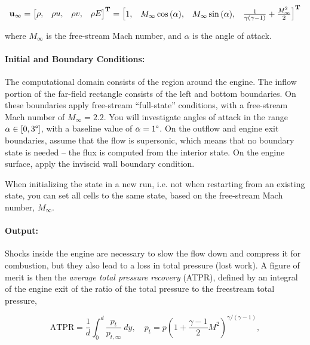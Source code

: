 \begin{equation}\label{eqn:flow}
    \bf{u}_{\infty} = \begin{bmatrix} \rho, & \rho u, & \rho v, & \rho E \end{bmatrix}^{T} = \begin{bmatrix}
        1, & M_\infty\cos{(\alpha)}, & M_\infty\sin{(\alpha)}, & \frac{1}{\gamma(\gamma-1)} + \frac{M_\infty^2}{2}
    \end{bmatrix}^T
\end{equation}

where $M_\infty$ is the free-stream Mach number, and $\alpha$ is the angle of attack.

\paragraph{Initial and Boundary Conditions:} The computational domain consists of the region around the engine. The inflow portion of the far-field rectangle consists of the left and bottom boundaries. On these boundaries apply free-stream ``full-state'' conditions, with a free-stream Mach number of $M_\infty = 2.2$. You will investigate angles of attack in the range $\alpha \in [0, 3\degree]$, with a baseline value of $\alpha = 1\degree$. On the outflow and engine exit boundaries, assume that the flow is supersonic, which means that no boundary state is needed -- the flux is computed from the interior state. On the engine surface, apply the inviscid wall boundary condition.

When initializing the state in a new run, i.e. not when restarting from an existing state, you can set all cells to the same state, based on the free-stream Mach number, $M_\infty$.


\paragraph{Output:} Shocks inside the engine are necessary to slow the flow down and compress it for combustion, but they also lead to a loss in total pressure (lost work). A figure of merit is then the
\textit{average total pressure recovery} (ATPR), defined by an integral of the engine exit of the ratio of the
total pressure to the freestream total pressure,

\begin{equation}\label{eqn:ATPR}
    \text{ATPR} = \frac{1}{d}\int_0^d\frac{p_t}{p_{t,\infty}}\ dy,\quad p_t = p\left(1 + \frac{\gamma - 1}{2}M^2\right)^{\gamma/(\gamma-1)},
\end{equation}

